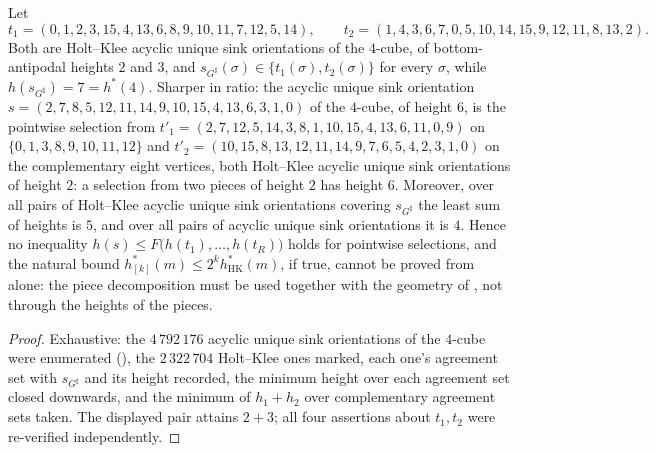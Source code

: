 \begin{proposition}\label{mb:nosum}
Let
\[
  t_1=(0,1,2,3,15,4,13,6,8,9,10,11,7,12,5,14),\qquad
  t_2=(1,4,3,6,7,0,5,10,14,15,9,12,11,8,13,2).
\]
Both are Holt--Klee acyclic unique sink orientations of the $4$-cube, of
bottom-antipodal heights $2$ and $3$, and
$s_{G^{\sharp}}(\sigma)\in\{t_1(\sigma),t_2(\sigma)\}$ for every $\sigma$,
while $h(s_{G^{\sharp}})=7=h^{\ast}(4)$. Sharper in ratio: the acyclic
unique sink orientation
$s=(2,7,8,5,12,11,14,9,10,15,4,13,6,3,1,0)$ of the $4$-cube, of height
$6$, is the pointwise selection from
$t'_1=(2,7,12,5,14,3,8,1,10,15,4,13,6,11,0,9)$ on
$\{0,1,3,8,9,10,11,12\}$ and
$t'_2=(10,15,8,13,12,11,14,9,7,6,5,4,2,3,1,0)$ on the complementary eight
vertices, both Holt--Klee acyclic unique sink orientations of height
$2$: a selection from two pieces of height $2$ has height $6$.
Moreover, over all pairs of
Holt--Klee acyclic unique sink orientations covering $s_{G^{\sharp}}$ the
least sum of heights is $5$, and over all pairs of acyclic unique sink
orientations it is $4$. Hence no inequality
$h(s)\le F\bigl(h(t_1),\dots,h(t_R)\bigr)$ holds for pointwise selections,
and the natural bound $h^{\ast}_{[k]}(m)\le2^{k}h^{\ast}_{\mathrm{HK}}(m)$,
if true, cannot be proved from  alone: the piece
decomposition must be used together with the geometry of
, not through the heights of the pieces.
\end{proposition}

\begin{proof}
Exhaustive: the $4\,792\,176$ acyclic unique sink orientations of the
$4$-cube were enumerated (), the $2\,322\,704$
Holt--Klee ones marked, each one's agreement set with $s_{G^{\sharp}}$ and
its height recorded, the minimum height over each agreement set closed
downwards, and the minimum of $h_1+h_2$ over complementary agreement sets
taken. The displayed pair attains $2+3$; all four assertions about
$t_1,t_2$ were re-verified independently.
\end{proof}

